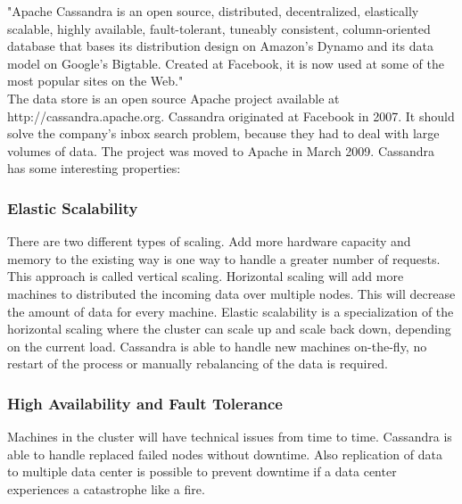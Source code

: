 \documentclass[a4paper]{article}
\begin{document}
"Apache Cassandra is an open source, distributed, decentralized, elastically scalable, highly  available, fault-tolerant, tuneably consistent, column-oriented database that bases its distribution design on Amazon's Dynamo and its data model on Google's Bigtable. Created at Facebook, it is now used at some of the most popular sites on the Web."\\

The data store is an open source Apache project available at http://cassandra.apache.org. Cassandra originated at Facebook in 2007. It should solve the company's inbox search problem, because they had to deal with large volumes of data. The project was moved to Apache in March 2009. Cassandra has some interesting properties:

\subsubsection{Elastic Scalability }
There are two different types of scaling. Add more hardware capacity and memory to the existing way is one way to handle a greater number of requests. This approach is called vertical scaling. Horizontal scaling will add more machines to distributed the incoming data over multiple nodes. This will decrease the amount of data for every machine. Elastic scalability is a specialization of the horizontal scaling where the cluster can scale up and scale back down, depending on the current load. Cassandra is able to handle new machines on-the-fly, no restart of the process or manually rebalancing of the data is required. 
\subsubsection{High Availability and Fault Tolerance}
Machines in the cluster will have technical issues from time to time. Cassandra is able to handle replaced failed nodes without downtime. Also replication of data to multiple data center is possible to prevent downtime if a data center experiences a catastrophe like a fire. 
\end{document}

